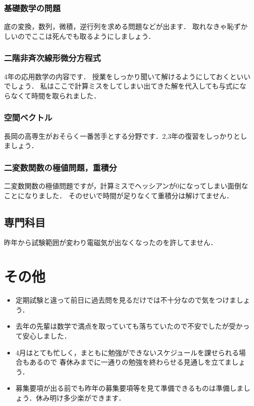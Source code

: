 \documentclass[dvipdfmx]{jsarticle}
\begin{document}
\subsubsection*{基礎数学の問題}
底の変換，数列，微積，逆行列を求める問題などが出ます．
取れなきゃ恥ずかしいのでここは死んでも取るようにしましょう．

\subsubsection*{二階非斉次線形微分方程式}
4年の応用数学の内容です．
授業をしっかり聞いて解けるようにしておくといいでしょう．
私はここで計算ミスをしてしまい出てきた解を代入しても与式にならなくて時間を取られました．

\subsubsection*{空間ベクトル}
長岡の高専生がおそらく一番苦手とする分野です．2,3年の復習をしっかりとしましょう．

\subsubsection*{二変数関数の極値問題，重積分}
二変数関数の極値問題ですが，計算ミスでヘッシアンが0になってしまい面倒なことになりました．
そのせいで時間が足りなくて重積分は解けてません．


\subsection{専門科目}
昨年から試験範囲が変わり電磁気が出なくなったのを許してません．


\section{その他}
\begin{itemize}
  \item 定期試験と違って前日に過去問を見るだけでは不十分なので気をつけましょう．
  \item 去年の先輩は数学で満点を取っていても落ちていたので不安でしたが受かって安心しました．
  \item 4月はとても忙しく，まともに勉強ができないスケジュールを課せられる場合もあるので
        春休みまでに一通りの勉強を終わらせる見通しを立てましょう．
  \item 募集要項が出る前でも昨年の募集要項等を見て準備できるものは準備しましょう．休み明け多少楽ができます．
\end{itemize}
\end{document}

